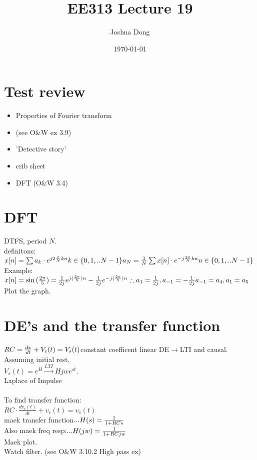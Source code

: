 \documentclass{article}
\begin{document}
\title{EE313\: Lecture 19}
\author{Joshua Dong}
\date{\today}
\maketitle

\section{Test review}
\begin{itemize}
    \item Properties of Fourier transform 
    \item (see O\&W ex 3.9)
    \item 'Detective story'
    \item crib sheet
    \item DFT (O\&W 3.4)
\end{itemize}


\section{DFT}
DTFS, period $N$.
\\definitons:
\\$x[n] = \sum a_k \cdot e^{j2 \frac{\pi}{N}kn}
\\k \in \{0,1,..N-1\}
\\a_N = \frac{1}{N} \sum x[n] \cdot e^{-j \frac{2\pi}{N}kn}
\\n \in \{0,1,..N-1\}
\\$Example:
\\$x[n] = \sin{(\frac{2\pi}{5})} =
\frac{1}{2j}e^{j(\frac{2\pi}{5})n} -
\frac{1}{2j}e^{-j(\frac{2\pi}{5})n}
\\\therefore a_1 = \frac{1}{2j}, a_{-1} = -\frac{1}{2j}
\\a_{-1} = a_{4},
\\a_{1} = a_{5}
$
\\Plot the graph.

\section{DE's and the transfer function}
$RC = \frac{dx}{dt} + V_c(t) = V_s(t)
\\$constant coefficent linear DE$ \rightarrow $LTI and causal.
\\Assuming initial rest, 
\\$V_s(t) = e^H \xrightarrow{LTI} Hjwe^{st}.
$\\Laplace of Impulse
\\
\\To find transfer function:
\\$RC \cdot \frac{dv_c(t)}{dt} + v_c(t) = v_s(t)
$\\maek transfer function$
\\...
\\H(s) = \frac{1}{1 + RCs}
$\\Also maek freq resp:$
\\...
\\H(jw) = \frac{1}{1+RCjw}
$
\\Maek plot.
\\Watch filter. (see O\&W 3.10.2 High pass ex)
\end{document}
